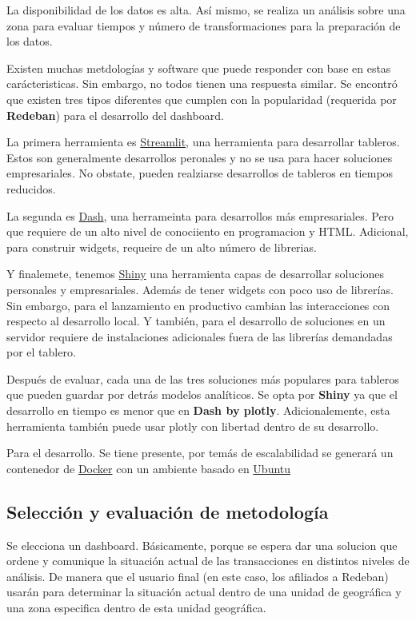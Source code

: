 \documentclass[a4paper]{article}
\begin{document}
La disponibilidad de los datos es alta. Así mismo, se realiza un análisis sobre una zona para evaluar tiempos y número de transformaciones para la preparación de los datos.

Existen muchas metdologías y software que puede responder con base en estas carácteristicas. Sin embargo, no todos tienen una respuesta similar. Se encontró que existen tres tipos diferentes que cumplen con la popularidad (requerida por \textbf{Redeban}) para el desarrollo del dashboard.

La primera herramienta es \href{https://www.streamlit.io/}{Streamlit}, una herramienta para desarrollar tableros. Estos son generalmente desarrollos peronales y no se usa para hacer soluciones empresariales. No obstate, pueden realziarse desarrollos de tableros en tiempos reducidos.

La segunda es \href{https://dash.plotly.com/}{Dash}, una herrameinta para desarrollos más empresariales. Pero que requiere de un alto nivel de conociiento en programacion y HTML. Adicional, para construir widgets, requeire de un alto número de librerias.

Y finalemete, tenemos \href{https://shiny.rstudio.com/}{Shiny} una herramienta capas de desarrollar soluciones personales y empresariales. Además de tener widgets con poco uso de librerías. Sin embargo, para el lanzamiento en productivo cambian las interacciones con respecto al desarrollo local. Y también, para el desarrollo de soluciones en un servidor requiere de instalaciones adicionales fuera de las librerías demandadas por el tablero.

Después de evaluar, cada una de las tres soluciones más populares para tableros que pueden guardar por detrás modelos analíticos. Se opta por \textbf{Shiny} ya que el desarrollo en tiempo es menor que en \textbf{Dash by plotly}. Adicionalemente, esta herramienta también puede usar plotly con libertad dentro de su desarrollo.

Para el desarrollo. Se tiene presente, por temás de escalabilidad se generará un contenedor de \href{https://www.docker.com/}{Docker} con un ambiente basado en \href{https://ubuntu.com/}{Ubuntu}


\subsection{Selección y evaluación de metodología}

Se elecciona un dashboard. Básicamente, porque se espera dar una solucion que ordene y comunique la situación actual de las transacciones en distintos niveles de análisis. De manera que el usuario final (en este caso, los afiliados a Redeban) usarán para determinar la situación actual dentro de una unidad de geográfica y una zona especifica dentro de esta unidad geográfica.
\end{document}
